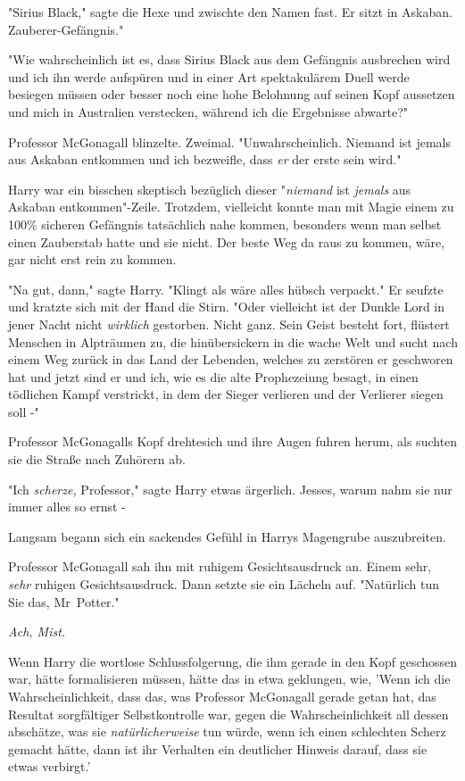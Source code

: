 {"Sirius Black," sagte die Hexe und zwischte den Namen fast. Er sitzt in Askaban. Zauberer-Gefängnis."

"Wie wahrscheinlich ist es, dass Sirius Black aus dem Gefängnis ausbrechen wird und ich ihn werde aufspüren und in einer Art spektakulärem Duell werde besiegen müssen oder besser noch eine hohe Belohnung auf seinen Kopf aussetzen und mich in Australien verstecken, während ich die Ergebnisse abwarte?"

Professor McGonagall blinzelte. Zweimal. "Unwahrscheinlich. Niemand ist jemals aus Askaban entkommen und ich bezweifle, dass \emph{er} der erste sein wird."

Harry war ein bisschen skeptisch bezüglich dieser "\emph{niemand} ist \emph{jemals} aus Askaban entkommen"-Zeile. Trotzdem, vielleicht konnte man mit Magie einem zu 100\% sicheren Gefängnis tatsächlich nahe kommen, besonders wenn man selbst einen Zauberstab hatte und sie nicht. Der beste Weg da raus zu kommen, wäre, gar nicht erst rein zu kommen.

"Na gut, dann," sagte Harry. "Klingt als wäre alles hübsch verpackt." Er seufzte und kratzte sich mit der Hand die Stirn. "Oder vielleicht ist der Dunkle Lord in jener Nacht nicht \emph{wirklich} gestorben. Nicht ganz. Sein Geist besteht fort, flüstert Menschen in Alpträumen zu, die hinübersickern in die wache Welt und sucht nach einem Weg zurück in das Land der Lebenden, welches zu zerstören er geschworen hat und jetzt sind er und ich, wie es die alte Prophezeiung besagt, in einen tödlichen Kampf verstrickt, in dem der Sieger verlieren und der Verlierer siegen soll -"

Professor McGonagalls Kopf drehtesich und ihre Augen fuhren herum, als suchten sie die Straße nach Zuhörern ab.

"Ich \emph{scherze,} Professor," sagte Harry etwas ärgerlich. Jesses, warum nahm sie nur immer alles so ernst -

Langsam begann sich ein sackendes Gefühl in Harrys Magengrube auszubreiten.

Professor McGonagall sah ihn mit ruhigem Gesichtsausdruck an. Einem sehr, \emph{sehr} ruhigen Gesichtsausdruck. Dann setzte sie ein Lächeln auf. "Natürlich tun Sie das, Mr~Potter."

\emph{Ach, Mist.}

Wenn Harry die wortlose Schlussfolgerung, die ihm gerade in den Kopf geschossen war, hätte formalisieren müssen, hätte das in etwa geklungen, wie, 'Wenn ich die Wahrscheinlichkeit, dass das, was Professor McGonagall gerade getan hat, das Resultat sorgfältiger Selbstkontrolle war, gegen die Wahrscheinlichkeit all dessen abschätze, was sie \emph{natürlicherweise} tun würde, wenn ich einen schlechten Scherz gemacht hätte, dann ist ihr Verhalten ein deutlicher Hinweis darauf, dass sie etwas verbirgt.'

}
